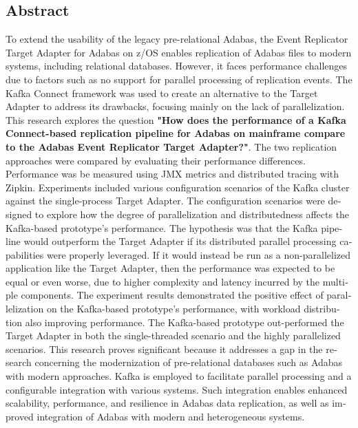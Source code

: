 

\begin{otherlanguage}{american}
	\chapter*{Abstract}
	To extend the usability of the legacy pre-relational Adabas, the Event Replicator Target Adapter for Adabas on z/OS enables replication of Adabas files to modern systems, including relational databases. However, it faces performance challenges due to factors such as no support for parallel processing of replication events. The Kafka Connect framework was used to create an alternative to the Target Adapter to address its drawbacks, focusing mainly on the lack of parallelization. This research explores the question \textbf{"How does the performance of a Kafka Connect-based replication pipeline for Adabas on mainframe compare to the Adabas Event Replicator Target Adapter?"}. The two replication approaches were compared by evaluating their performance differences. Performance was be measured using JMX metrics and distributed tracing with Zipkin. Experiments included various configuration scenarios of the Kafka cluster against the single-process Target Adapter. The configuration scenarios were designed to explore how the degree of parallelization and distributedness affects the Kafka-based prototype's performance.
    The hypothesis was that the Kafka pipeline would outperform the Target Adapter if its distributed parallel processing capabilities were properly leveraged. If it would instead be run as a non-parallelized application like the Target Adapter, then the performance was expected to be equal or even worse, due to higher complexity and latency incurred by the multiple components.
    The experiment results demonstrated the positive effect of parallelization on the Kafka-based prototype's performance, with workload distribution also improving performance. The Kafka-based prototype out-performed the Target Adapter in both the single-threaded scenario and the highly parallelized scenarios.
    This research proves significant because it addresses a gap in the research concerning the modernization of pre-relational databases such as Adabas with modern approaches. Kafka is employed to facilitate parallel processing and a configurable integration with various systems. Such integration enables enhanced scalability, performance, and resilience in Adabas data replication, as well as improved integration of Adabas with modern and heterogeneous systems.
\end{otherlanguage}
